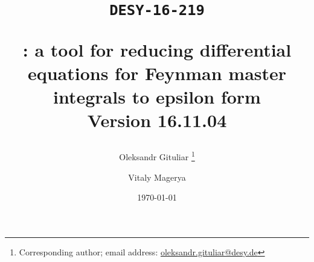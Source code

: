 \title{
  \begin{flushright}
  \tt\normalsize{DESY-16-219}\\ 
  \end{flushright}
  \vspace{1cm}
  \Large \bf \fuchsia: a tool for reducing differential equations for Feynman master integrals to epsilon form\\
  \vspace{0.5cm}
  \normalsize \bf Version 16.11.04
}

\author[a]{Oleksandr Gituliar%
    \thanks{Corresponding author; email address:
        \href{mailto:oleksandr.gituliar@desy.de}
            {oleksandr.gituliar@desy.de}}}

\author[b]{Vitaly Magerya}


\date{\today\\\vspace{0.5cm}{\bf \LARGE DRAFT}}

